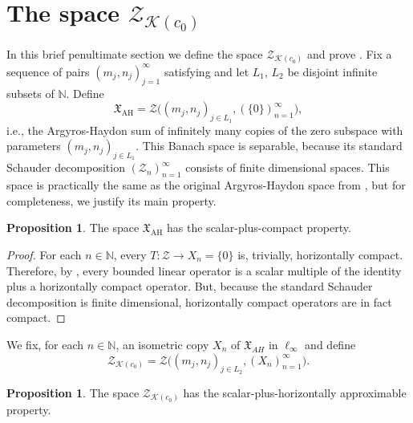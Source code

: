 \documentclass[11pt]{amsart}
\theoremstyle{definition}
\newtheorem{proposition}[theorem]{Proposition}
\newcommand{\N}{\mathbb{N}}
\numberwithin{equation}{section}
\begin{document}
\section{The space $\mathcal{Z}_{\mathcal{K}(c_0)}$}
\label{ZKC0 section}
In this brief penultimate section we define the space $\mathcal{Z}_{\mathcal{K}(c_0)}$ and prove . Fix a sequence of pairs $(m_j,n_j)_{j=1}^\infty$ satisfying  and let $L_1$, $L_2$ be disjoint infinite subsets of $\N$. Define
\[\mathfrak{X}_\mathrm{AH} = \mathcal{Z}\big((m_j,n_j)_{j\in L_1},(\{0\})_{n=1}^\infty\big),\]
i.e., the Argyros-Haydon sum of infinitely many copies of the zero subspace with parameters $(m_j,n_j)_{j\in L_1}$. This Banach space is separable, because its standard Schauder decomposition $(\mathcal{Z}_n)_{n=1}^\infty$ consists of finite dimensional spaces. This space is practically the same as the original Argyros-Haydon space from \cite{argyros:haydon:2011}, but for completeness, we justify its main property.

\begin{proposition}
\label{XAH has scalar-plus-compact}
The space $\mathfrak{X}_\mathrm{AH}$ has the scalar-plus-compact property.    
\end{proposition}

\begin{proof}
For each $n\in\N$, every $T:\mathcal{Z}\to X_n = \{0\}$ is, trivially, horizontally compact. Therefore, by , every bounded linear operator is a scalar multiple of the identity plus a horizontally compact operator. But, because the standard Schauder decomposition is finite dimensional, horizontally compact operators are in fact compact.
\end{proof}

We fix, for each $n\in\N$, an isometric copy $X_n$ of $\mathfrak{X}_{AH}$ in $\ell_\infty$ and define
\[\mathcal{Z}_{\mathcal{K}(c_0)} = \mathcal{Z}\big((m_j,n_j)_{j\in L_2},(X_n)_{n=1}^\infty\big).\]

\begin{proposition}
\label{ZKC0 has scalar-plus-horizontally approximable}
The space $\mathcal{Z}_{\mathcal{K}(c_0)}$ has the scalar-plus-horizontally approximable property.    
\end{proposition}
\end{document}
